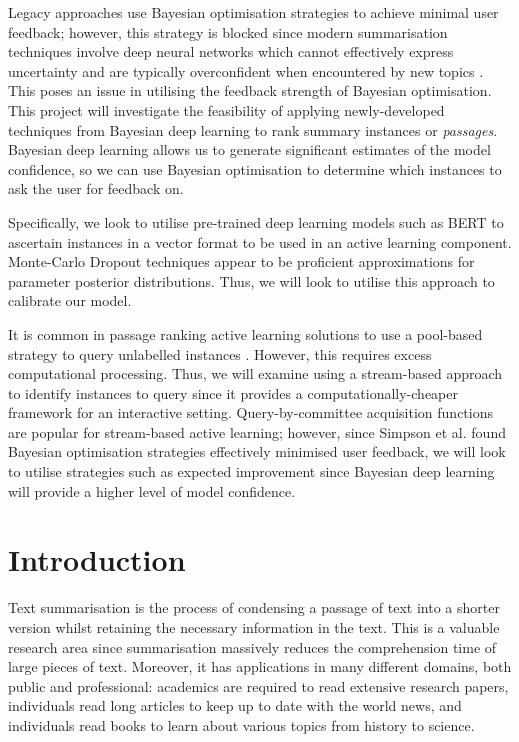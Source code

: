 \documentclass[ %
                    author={James Stephenson},
                supervisor={Dr. Edwin Simpson},
                    degree={MSc},
                     title={PROJECT PLAN},
                  subtitle={Bayesian Deep Learning For Extractive Test Summarisation},
                      type={},
                      year={2022}]{../additions/dissertation}
\begin{document}
		\medbreak	
		Legacy approaches use Bayesian optimisation \cite{Simpson19} strategies to achieve minimal user feedback; however, this strategy is blocked since modern summarisation techniques involve deep neural networks which cannot effectively express uncertainty and are typically overconfident when encountered by new topics \cite{Xu19}. This poses an issue in utilising the feedback strength of Bayesian optimisation. This project will investigate the feasibility of applying newly-developed techniques from Bayesian deep learning \cite{Wilson20} to rank summary instances or \emph{passages}. Bayesian deep learning allows us to generate significant estimates of the model confidence, so we can use Bayesian optimisation to determine which instances to ask the user for feedback on.

		\medbreak		
		Specifically, we look to utilise pre-trained deep learning models such as BERT \cite{Navin21} to ascertain instances in a vector format to be used in an active learning component. Monte-Carlo Dropout \cite{Gal15} techniques appear to be proficient approximations for parameter posterior distributions. Thus, we will look to utilise this approach to calibrate our model.

		\medbreak
		It is common in passage ranking active learning solutions to use a pool-based strategy to query unlabelled instances \cite{EinDor20}. However, this requires excess computational processing. Thus, we will examine using a stream-based approach to identify instances to query since it provides a computationally-cheaper framework for an interactive setting. Query-by-committee acquisition functions are popular for stream-based active learning; however, since Simpson et al. \cite{Simpson19} found Bayesian optimisation strategies effectively minimised user feedback, we will look to utilise strategies such as expected improvement since Bayesian deep learning will provide a higher level of model confidence. 

		
		
	
	\mainmatter
	
	 
	\chapter{Introduction}
	\label{chap:introduction} 
		
		Text summarisation is the process of condensing a passage of text into a shorter version whilst retaining the necessary information in the text. This is a valuable research area since summarisation massively reduces the comprehension time of large pieces of text. Moreover, it has applications in many different domains, both public and professional: academics are required to read extensive research papers, individuals read long articles to keep up to date with the world news, and individuals read books to learn about various topics from history to science.
\end{document}
